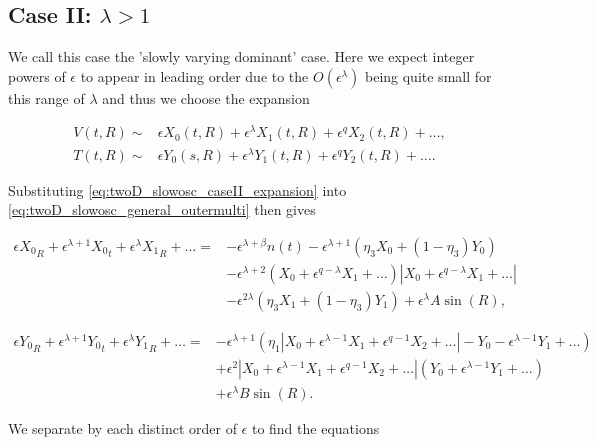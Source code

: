 \subsection{Case II: $\lambda>1$}

We call this case the 'slowly varying dominant' case. Here we expect integer powers of $\epsilon$ to appear in leading order due to the $O(\epsilon^\lambda)$ being quite small for this range of $\lambda$ and thus we choose the expansion 

\begin{equation}\label{eq:twoD_slowosc_caseII_expansion}
\begin{aligned}
V(t,R) \sim& \epsilon X_0(t,R)+\epsilon^\lambda X_1(t,R)+\epsilon^q X_2(t,R)+\ldots,\\
T(t,R) \sim& \epsilon Y_0(s,R) + \epsilon^\lambda Y_1(t,R) +\epsilon^q Y_2(t,R)+\ldots.
\end{aligned}
\end{equation}

Substituting \eqref{eq:twoD_slowosc_caseII_expansion} into \eqref{eq:twoD_slowosc_general_outermulti} then gives

\begin{equation*}
\begin{aligned}
\epsilon {X_0}_R+\epsilon^{\lambda+1}{X_0}_t+\epsilon^\lambda {X_1}_R+\ldots={} & -\epsilon^{\lambda+\beta}n(t)-\epsilon^{\lambda+1} (\eta_3X_0+(1-\eta_3)Y_0) \\
&-\epsilon^{\lambda+2}(X_0+\epsilon^{q-\lambda} X_1+\ldots)|X_0+\epsilon^{q-\lambda} X_1+\ldots|\\
& - \epsilon^{2\lambda}(\eta_3X_1+(1-\eta_3)Y_1) + \epsilon^\lambda A\sin(R),
\end{aligned}
\end{equation*}

\begin{equation*}
\begin{aligned}
\epsilon {Y_0}_R+\epsilon^{\lambda+1}{Y_0}_t+\epsilon^\lambda {Y_1}_R+\ldots=& -\epsilon^{\lambda+1}(\eta_1|X_0 +\epsilon^{\lambda-1} X_1+\epsilon^{q-1} X_2+\ldots|- Y_0-\epsilon^{\lambda-1} Y_1+\ldots)\\
&+\epsilon^2|X_0 +\epsilon^{\lambda-1} X_1+\epsilon^{q-1} X_2+\ldots|(Y_0 +\epsilon^{\lambda-1} Y_1+\ldots)\\
&+\epsilon^\lambda B \sin (R).
\end{aligned}
\end{equation*}

We separate by each distinct order of $\epsilon$ to find the equations

